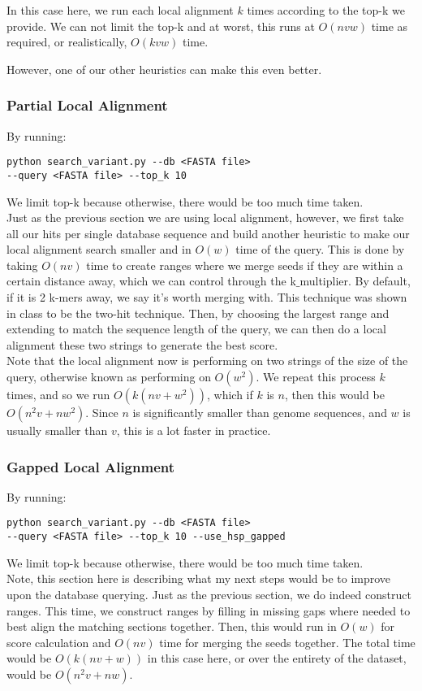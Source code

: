 \documentclass[10pt]{article}
\begin{document}
In this case here, we run each local alignment $k$ times according to the top-k we provide. We can not limit the top-k and at worst, this runs at $O(nvw)$ time as required, or realistically, $O(kvw)$ time.

However, one of our other heuristics can make this even better.

\subsubsection*{Partial Local Alignment}
By running:
\begin{lstlisting}
python search_variant.py --db <FASTA file> 
--query <FASTA file> --top_k 10
\end{lstlisting}
We limit top-k because otherwise, there would be too much time taken.\\

Just as the previous section we are using local alignment, however, we first take all our hits per single database sequence and build another heuristic to make our local alignment search smaller and in $O(w)$ time of the query. This is done by taking $O(nv)$ time to create ranges where we merge seeds if they are within a certain distance away, which we can control through the k$\_$multiplier. By default, if it is 2 k-mers away, we say it's worth merging with. This technique was shown in class to be the two-hit technique. Then, by choosing the largest range and extending to match the sequence length of the query, we can then do a local alignment these two strings to generate the best score.\\

Note that the local alignment now is performing on two strings of the size of the query, otherwise known as performing on $O(w^2)$. We repeat this process $k$ times, and so we run $O(k(nv + w^2))$, which if $k$ is $n$, then this would be $O(n^2v + nw^2)$. Since $n$ is significantly smaller than genome sequences, and $w$ is usually smaller than $v$, this is a lot faster in practice.

\subsubsection*{Gapped Local Alignment}
By running:
\begin{lstlisting}
python search_variant.py --db <FASTA file> 
--query <FASTA file> --top_k 10 --use_hsp_gapped
\end{lstlisting}
We limit top-k because otherwise, there would be too much time taken.\\

Note, this section here is describing what my next steps would be to improve upon the database querying. Just as the previous section, we do indeed construct ranges. This time, we construct ranges by filling in missing gaps where needed to best align the matching sections together. Then, this would run in $O(w)$ for score calculation and $O(nv)$ time for merging the seeds together. The total time would be $O(k(nv + w))$ in this case here, or over the entirety of the dataset, would be $O(n^2v + nw)$.
\end{document}

